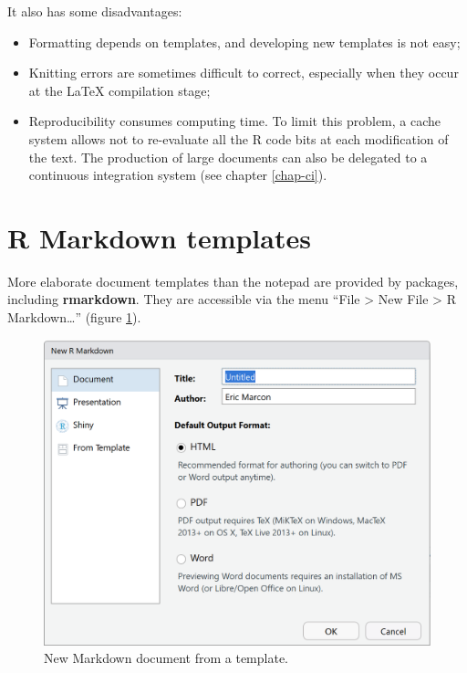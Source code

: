 \documentclass[
  12pt,
  american,
  a4paper,
  extrafontsizes,onecolumn,openright
  ]{memoir}
\providecommand{\tightlist}{%
  \setlength{\itemsep}{0pt}\setlength{\parskip}{0pt}}
\begin{document}
It also has some disadvantages:

\begin{itemize}
\tightlist
\item
  Formatting depends on templates, and developing new templates is not easy;
\item
  Knitting errors are sometimes difficult to correct, especially when they occur at the LaTeX compilation stage;
\item
  Reproducibility consumes computing time. To limit this problem, a cache system allows not to re-evaluate all the R code bits at each modification of the text. The production of large documents can also be delegated to a continuous integration system (see chapter \ref{chap-ci}).
\end{itemize}

\hypertarget{r-markdown-templates}{%
\section{R Markdown templates}\label{r-markdown-templates}}

More elaborate document templates than the notepad are provided by packages, including \textbf{rmarkdown}.
They are accessible via the menu \enquote{File \textgreater{} New File \textgreater{} R Markdown\ldots{}} (figure \ref{fig:e-rmd1}).



\scriptsize

\begin{figure}

{\centering \includegraphics[width=0.8\linewidth]{images/e-rmd1} 

}

\caption{New Markdown document from a template.}\label{fig:e-rmd1}
\end{figure}
\end{document}
